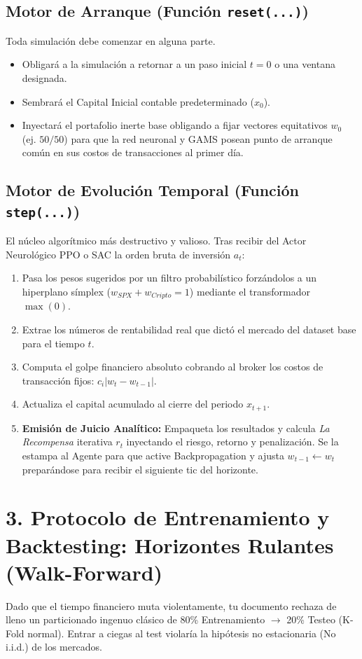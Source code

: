 \documentclass[11pt,a4paper]{article}
\begin{document}
\subsection{Motor de Arranque (Función \texttt{reset(...)})}
Toda simulación debe comenzar en alguna parte.
\begin{itemize}
    \item Obligará a la simulación a retornar a un paso inicial $t=0$ o una ventana designada.
    \item Sembrará el Capital Inicial contable predeterminado ($x_0$).
    \item Inyectará el portafolio inerte base obligando a fijar vectores equitativos $w_0$ (ej. $50/50$) para que la red neuronal y GAMS posean punto de arranque común en sus costos de transacciones al primer día.
\end{itemize}

\subsection{Motor de Evolución Temporal (Función \texttt{step(...)})}
El núcleo algorítmico más destructivo y valioso. Tras recibir del Actor Neurológico PPO o SAC la orden bruta de inversión $a_t$:
\begin{enumerate}
    \item Pasa los pesos sugeridos por un filtro probabilístico forzándolos a un hiperplano símplex ($w_{SPX} + w_{Cripto} = 1$) mediante el transformador $\max(0)$.
    \item Extrae los números de rentabilidad real que dictó el mercado del dataset base para el tiempo $t$.
    \item Computa el golpe financiero absoluto cobrando al broker los costos de transacción fijos: $c_i |w_t - w_{t-1}|$.
    \item Actualiza el capital acumulado al cierre del periodo $x_{t+1}$.
    \item \textbf{Emisión de Juicio Analítico:} Empaqueta los resultados y calcula \textit{La Recompensa} iterativa $r_t$ inyectando el riesgo, retorno y penalización. Se la estampa al Agente para que active Backpropagation y ajusta $w_{t-1} \leftarrow w_t$ preparándose para recibir el siguiente tic del horizonte.
\end{enumerate}

\section{3. Protocolo de Entrenamiento y Backtesting: Horizontes Rulantes (Walk-Forward)}
Dado que el tiempo financiero muta violentamente, tu documento rechaza de lleno un particionado ingenuo clásico de 80\% Entrenamiento $\rightarrow$ 20\% Testeo (K-Fold normal). Entrar a ciegas al test violaría la hipótesis no estacionaria (No i.i.d.) de los mercados.
\end{document}
